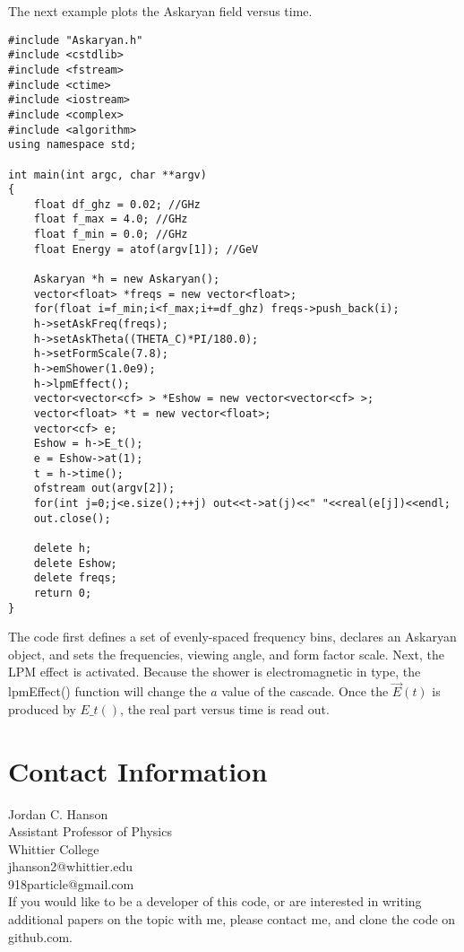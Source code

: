 \documentclass[10pt]{article}
\begin{document}
The next example plots the Askaryan field versus time.

\begin{verbatim}
#include "Askaryan.h"
#include <cstdlib>
#include <fstream>
#include <ctime>
#include <iostream>
#include <complex>
#include <algorithm>
using namespace std;

int main(int argc, char **argv)
{
	float df_ghz = 0.02; //GHz
	float f_max = 4.0; //GHz
	float f_min = 0.0; //GHz
	float Energy = atof(argv[1]); //GeV
	
	Askaryan *h = new Askaryan();
	vector<float> *freqs = new vector<float>;
	for(float i=f_min;i<f_max;i+=df_ghz) freqs->push_back(i);
	h->setAskFreq(freqs);
	h->setAskTheta((THETA_C)*PI/180.0);
	h->setFormScale(7.8);
	h->emShower(1.0e9);
	h->lpmEffect();
	vector<vector<cf> > *Eshow = new vector<vector<cf> >;
	vector<float> *t = new vector<float>;
	vector<cf> e;
	Eshow = h->E_t();
	e = Eshow->at(1);
	t = h->time();
	ofstream out(argv[2]);
	for(int j=0;j<e.size();++j) out<<t->at(j)<<" "<<real(e[j])<<endl;
	out.close();
    
	delete h;
	delete Eshow;
	delete freqs;
	return 0;
}
\end{verbatim}
The code first defines a set of evenly-spaced frequency bins, declares an Askaryan object, and sets the frequencies, viewing angle, and form factor scale.  Next, the LPM effect is activated.  Because the shower is electromagnetic in type, the lpmEffect() function will change the $a$ value of the cascade.  Once the $\vec{E}(t)$ is produced by $E\_t()$, the real part versus time is read out.

\section{Contact Information}

Jordan C. Hanson \\
Assistant Professor of Physics \\
Whittier College \\
jhanson2@whittier.edu \\
918particle@gmail.com \\

If you would like to be a developer of this code, or are interested in writing additional papers on the topic with me, please contact me, and clone the code on github.com.
\end{document}
